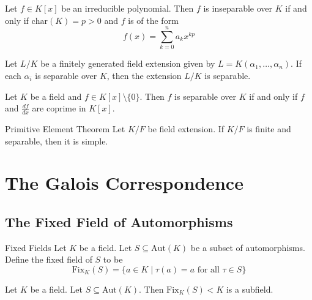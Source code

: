 \documentclass[a4paper]{article}
\begin{document}
\begin{prp}{}{} Let $f\in K[x]$ be an irreducible polynomial. Then $f$ is inseparable over $K$ if and only if $\text{char}(K)=p>0$ and $f$ is of the form $$f(x)=\sum_{k=0}^na_kx^{kp}$$
\end{prp}

\begin{prp}{}{} Let $L/K$ be a finitely generated field extension given by $L=K(\alpha_1,\dots,\alpha_n)$. If each $\alpha_i$ is separable over $K$, then the extension $L/K$ is separable. 
\end{prp}

\begin{lmm}{}{} Let $K$ be a field and $f\in K[x]\setminus\{0\}$. Then $f$ is separable over $K$ if and only if $f$ and $\frac{df}{dx}$ are coprime in $K[x]$. 
\end{lmm}

\begin{thm}{Primitive Element Theorem}{} Let $K/F$ be field extension. If $K/F$ is finite and separable, then it is simple. 
\end{thm}

\pagebreak
\section{The Galois Correspondence}
\subsection{The Fixed Field of Automorphisms}
\begin{defn}{Fixed Fields}{} Let $K$ be a field. Let $S\subseteq\text{Aut}(K)$ be a subset of automorphisms. Define the fixed field of $S$ to be $$\text{Fix}_K(S)=\{a\in K\;|\;\tau(a)=a\text{ for all }\tau\in S\}$$
\end{defn}

\begin{lmm}{}{} Let $K$ be a field. Let $S\subseteq\text{Aut}(K)$. Then $\text{Fix}_K(S)<K$ is a subfield. 
\end{lmm}
\end{document}

